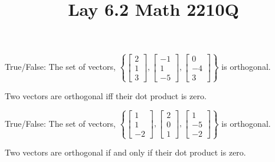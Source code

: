\documentclass{ximera}
\begin{document}
  	\title{Lay 6.2  \hfill Math 2210Q} 
  	  		    \begin{question} True/False: The set of vectors, $\left\{  \begin{bmatrix} 2\\1\\3\end{bmatrix},  \begin{bmatrix} -1\\1\\-5\end{bmatrix},  \begin{bmatrix} 0\\-4\\3\end{bmatrix}    \right  \}$ is orthogonal.\\
  	  		    	
  	  		    	\begin{multipleChoice}
  	  		    		\end{multipleChoice}
  	  		    		
  	  		    		\begin{hint} Two vectors are orthogonal iff their dot product is zero. \end{hint}
  	  		    	
  	  		    \end{question}	
  	  		      \begin{question} True/False: The set of vectors, $\left\{  \begin{bmatrix} 1\\1\\-2\end{bmatrix},  \begin{bmatrix} 2\\0\\1\end{bmatrix},  \begin{bmatrix} 1\\-5\\-2\end{bmatrix}     \right \}$ is orthogonal.\\
  	  		      	
  	  		      	\begin{multipleChoice}
  	  		      		\choice[correct]{True}
  	  		      		\choice{False}
  	  		      	\end{multipleChoice}
  	  		      	
  	  		      	\begin{hint} Two vectors are orthogonal if and only if their dot product is zero. \end{hint}
  	  		      	
  	  		      \end{question}	
\end{document}
